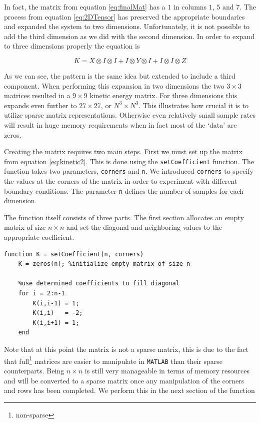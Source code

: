 \documentclass[authoryearcitations]{UoYCSproject}
\begin{document}
In fact, the matrix from equation \ref{eq:finalMat} has a $1$ in columns $1$, $5$ and $7$. The process from equation 
\ref{eq:2DTensor} has preserved the appropriate boundaries and expanded the system to two dimensions. Unfortunately,
it is not possible to add the third dimension as we did with the second dimension. In order to expand to three dimensions
properly the equation is

\begin{equation}
K = X \otimes I \otimes I + I \otimes Y \otimes I + I \otimes I \otimes Z
\label{eq:3DTensor}
\end{equation}

As we can see, the pattern is the same idea but extended to include a third component. When performing this expansion 
in two dimensions the two $3 \times 3$ matrices resulted in a $9 \times 9$ kinetic energy matrix. For three dimensions
this expands even further to $27 \times 27$, or $N^3 \times N^3$. This illustrates how crucial it is to utilize sparse 
matrix representations. Otherwise even relatively small sample rates will result in huge memory requirements when in fact
most of the `data' are zeros.

Creating the matrix requires two main steps. First we must set up the matrix from equation \ref{eq:kinetic2}. This is 
done using the \verb+setCoefficient+ function. The function takes two parameters, \verb+corners+ and
\verb+n+. We introduced \verb+corners+ to specify the values at the corners of the
matrix in order to experiment with different boundary conditions. The parameter \verb+n+ defines the number of samples
for each dimension. 

The function itself consists of three parts. The first section allocates an empty matrix of size $n \times n$ and 
set the diagonal and neighboring values to the appropriate coefficient. 

\begin{lstlisting}[caption={Function to create matrix of coefficients}, label=lst:setCoefficient]
    function K = setCoefficient(n, corners)
	K = zeros(n); %initialize empty matrix of size n
	
	%use determined coefficients to fill diagonal
	for i = 2:n-1
		K(i,i-1) = 1;
		K(i,i)   = -2;
		K(i,i+1) = 1;
	end
\end{lstlisting}


Note that
at this point the matrix is not a sparse matrix, this is due to the fact that full\footnote{non-sparse} matrices are
easier to manipulate in \verb+MATLAB+ than their sparse counterparts. Being $n \times n$ is still very manageable in terms
of memory resources and will be converted to a sparse matrix once any manipulation of the corners and rows has been completed. 
We perform this in the next section of the function
\end{document}
